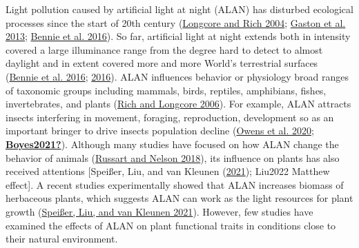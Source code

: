 \documentclass[
]{article}
\begin{document}
Light pollution caused by artificial light at night (ALAN) has disturbed
ecological processes since the start of 20th century
(\protect\hyperlink{ref-Longcore2004}{Longcore and Rich 2004};
\protect\hyperlink{ref-Gaston2013}{Gaston et al. 2013};
\protect\hyperlink{ref-Bennie2016}{Bennie et al. 2016}). So far,
artificial light at night extends both in intensity covered a large
illuminance range from the degree hard to detect to almost daylight and
in extent covered more and more World's terrestrial surfaces
(\protect\hyperlink{ref-Bennie2016}{Bennie et al. 2016};
\protect\hyperlink{ref-Falchi2016}{2016}). ALAN influences behavior or
physiology broad ranges of taxonomic groups including mammals, birds,
reptiles, amphibians, fishes, invertebrates, and plants
(\protect\hyperlink{ref-Rich2006}{Rich and Longcore 2006}). For example,
ALAN attracts insects interfering in movement, foraging, reproduction,
development so as an important bringer to drive insects population
decline (\protect\hyperlink{ref-Owens2020}{Owens et al. 2020};
\protect\hyperlink{ref-Boyes2021}{\textbf{Boyes2021?}}). Although many
studies have focused on how ALAN change the behavior of animals
(\protect\hyperlink{ref-Russart2018}{Russart and Nelson 2018}), its
influence on plants has also received attentions {[}Speißer, Liu, and
van Kleunen (\protect\hyperlink{ref-Speisser2021a}{2021}); Liu2022
Matthew effect{]}. A recent studies experimentally showed that ALAN
increases biomass of herbaceous plants, which suggests ALAN can work as
the light resources for plant growth
(\protect\hyperlink{ref-Speisser2021a}{Speißer, Liu, and van Kleunen
2021}). However, few studies have examined the effects of ALAN on plant
functional traits in conditions close to their natural environment.
\end{document}
